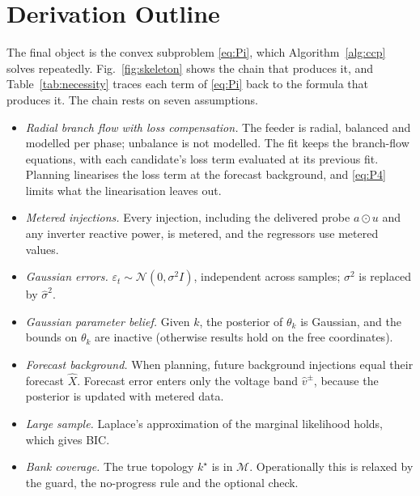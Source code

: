 \documentclass[journal,onecolumn,11pt]{IEEEtran}
\newcommand{\Nrm}{\mathcal{N}}
\begin{document}
\section{Derivation Outline}\label{sec:skeleton}
The final object is the convex subproblem \eqref{eq:Pi}, which Algorithm~\ref{alg:ccp} solves repeatedly. Fig.~\ref{fig:skeleton} shows the chain that produces it, and Table~\ref{tab:necessity} traces each term of \eqref{eq:Pi} back to the formula that produces it. The chain rests on seven assumptions.
\begin{itemize}
\item[A1] \emph{Radial branch flow with loss compensation.} The feeder is radial, balanced and modelled per phase; unbalance is not modelled. The fit keeps the branch-flow equations, with each candidate's loss term evaluated at its previous fit. Planning linearises the loss term at the forecast background, and \eqref{eq:P4} limits what the linearisation leaves out.
\item[A2] \emph{Metered injections.} Every injection, including the delivered probe $a\odot u$ and any inverter reactive power, is metered, and the regressors use metered values.
\item[A3] \emph{Gaussian errors.} $\varepsilon_t\sim\Nrm(0,\sigma^2I)$, independent across samples; $\sigma^2$ is replaced by $\hat\sigma^2$.
\item[A4] \emph{Gaussian parameter belief.} Given $k$, the posterior of $\theta_k$ is Gaussian, and the bounds on $\theta_k$ are inactive (otherwise results hold on the free coordinates).
\item[A5] \emph{Forecast background.} When planning, future background injections equal their forecast $\hat X$. Forecast error enters only the voltage band $\hat v^\pm$, because the posterior is updated with metered data.
\item[A6] \emph{Large sample.} Laplace's approximation of the marginal likelihood holds, which gives BIC.
\item[A7] \emph{Bank coverage.} The true topology $k^\star$ is in $\mathcal M$. Operationally this is relaxed by the guard, the no-progress rule and the optional check.
\end{itemize}
\end{document}
